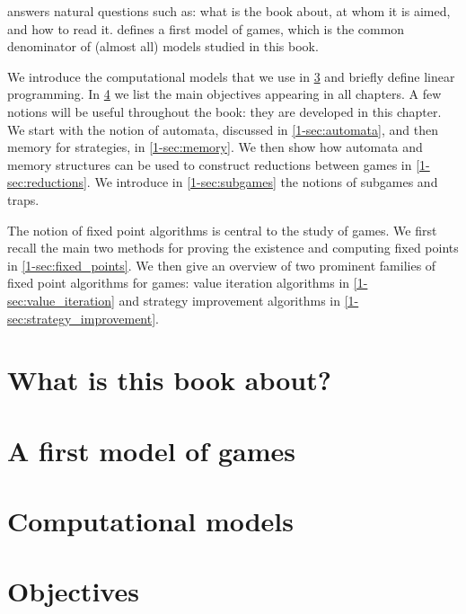 

 answers natural questions such as: what is the book about, at whom it is aimed, and how to read it.
 defines a first model of games, which is the common denominator of (almost all) models studied in this book.

We introduce the computational models that we use in \cref{1-sec:computation} and briefly define linear programming.
In \cref{1-sec:objectives} we list the main objectives appearing in all chapters.
A few notions will be useful throughout the book: they are developed in this chapter.
We start with the notion of automata, discussed in \cref{1-sec:automata}, and then memory for strategies, in \cref{1-sec:memory}.
We then show how automata and memory structures can be used to construct reductions between games in \cref{1-sec:reductions}.
We introduce in \cref{1-sec:subgames} the notions of subgames and traps.

The notion of fixed point algorithms is central to the study of games.
We first recall the main two methods for proving the existence and computing fixed points in \cref{1-sec:fixed_points}.
We then give an overview of two prominent families of fixed point algorithms for games:
value iteration algorithms in \cref{1-sec:value_iteration} and strategy improvement algorithms in \cref{1-sec:strategy_improvement}.

\section{What is this book about?}
\label{1-sec:intro}



\section{A first model of games}
\label{1-sec:simple}



\section{Computational models}
\label{1-sec:computation}



\section{Objectives}
\label{1-sec:objectives}


